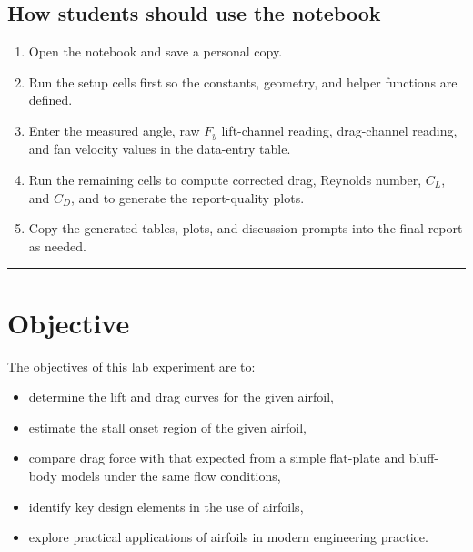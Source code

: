 \documentclass[12pt,letterpaper]{article}
\begin{document}
\subsection*{How students should use the notebook}
\begin{enumerate}[leftmargin=*, label=\arabic*.]
    \item Open the notebook and save a personal copy.
    \item Run the setup cells first so the constants, geometry, and helper functions are defined.
    \item Enter the measured angle, raw $F_y$ lift-channel reading, drag-channel reading, and fan velocity values in the data-entry table.
    \item Run the remaining cells to compute corrected drag, Reynolds number, \(C_L\), and \(C_D\), and to generate the report-quality plots.
    \item Copy the generated tables, plots, and discussion prompts into the final report as needed.
\end{enumerate}

\vspace{1em}

\hrule
\vspace{1em}

\section{Objective}
The objectives of this lab experiment are to:
\begin{itemize}[leftmargin=*]
    \item determine the lift and drag curves for the given airfoil,
    \item estimate the stall onset region of the given airfoil,
    \item compare drag force with that expected from a simple flat-plate and bluff-body models under the same flow conditions,
    \item identify key design elements in the use of airfoils,
    \item explore practical applications of airfoils in modern engineering practice.
\end{itemize}
\end{document}
